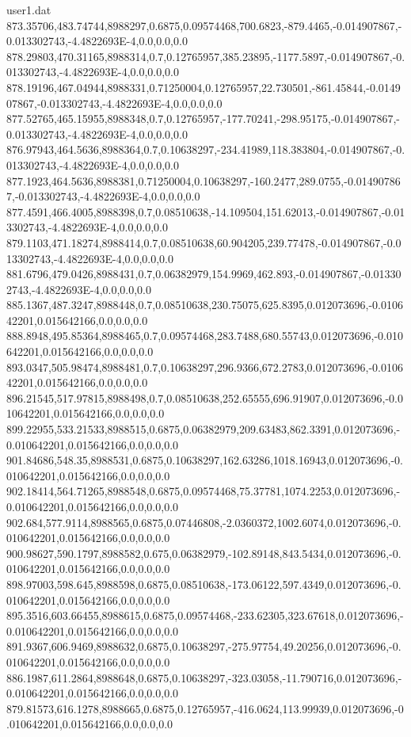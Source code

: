 \begin{filecontents}{user1.dat}
873.35706,483.74744,8988297,0.6875,0.09574468,700.6823,-879.4465,-0.014907867,-0.013302743,-4.4822693E-4,0.0,0.0,0.0
878.29803,470.31165,8988314,0.7,0.12765957,385.23895,-1177.5897,-0.014907867,-0.013302743,-4.4822693E-4,0.0,0.0,0.0
878.19196,467.04944,8988331,0.71250004,0.12765957,22.730501,-861.45844,-0.014907867,-0.013302743,-4.4822693E-4,0.0,0.0,0.0
877.52765,465.15955,8988348,0.7,0.12765957,-177.70241,-298.95175,-0.014907867,-0.013302743,-4.4822693E-4,0.0,0.0,0.0
876.97943,464.5636,8988364,0.7,0.10638297,-234.41989,118.383804,-0.014907867,-0.013302743,-4.4822693E-4,0.0,0.0,0.0
877.1923,464.5636,8988381,0.71250004,0.10638297,-160.2477,289.0755,-0.014907867,-0.013302743,-4.4822693E-4,0.0,0.0,0.0
877.4591,466.4005,8988398,0.7,0.08510638,-14.109504,151.62013,-0.014907867,-0.013302743,-4.4822693E-4,0.0,0.0,0.0
879.1103,471.18274,8988414,0.7,0.08510638,60.904205,239.77478,-0.014907867,-0.013302743,-4.4822693E-4,0.0,0.0,0.0
881.6796,479.0426,8988431,0.7,0.06382979,154.9969,462.893,-0.014907867,-0.013302743,-4.4822693E-4,0.0,0.0,0.0
885.1367,487.3247,8988448,0.7,0.08510638,230.75075,625.8395,0.012073696,-0.010642201,0.015642166,0.0,0.0,0.0
888.8948,495.85364,8988465,0.7,0.09574468,283.7488,680.55743,0.012073696,-0.010642201,0.015642166,0.0,0.0,0.0
893.0347,505.98474,8988481,0.7,0.10638297,296.9366,672.2783,0.012073696,-0.010642201,0.015642166,0.0,0.0,0.0
896.21545,517.97815,8988498,0.7,0.08510638,252.65555,696.91907,0.012073696,-0.010642201,0.015642166,0.0,0.0,0.0
899.22955,533.21533,8988515,0.6875,0.06382979,209.63483,862.3391,0.012073696,-0.010642201,0.015642166,0.0,0.0,0.0
901.84686,548.35,8988531,0.6875,0.10638297,162.63286,1018.16943,0.012073696,-0.010642201,0.015642166,0.0,0.0,0.0
902.18414,564.71265,8988548,0.6875,0.09574468,75.37781,1074.2253,0.012073696,-0.010642201,0.015642166,0.0,0.0,0.0
902.684,577.9114,8988565,0.6875,0.07446808,-2.0360372,1002.6074,0.012073696,-0.010642201,0.015642166,0.0,0.0,0.0
900.98627,590.1797,8988582,0.675,0.06382979,-102.89148,843.5434,0.012073696,-0.010642201,0.015642166,0.0,0.0,0.0
898.97003,598.645,8988598,0.6875,0.08510638,-173.06122,597.4349,0.012073696,-0.010642201,0.015642166,0.0,0.0,0.0
895.3516,603.66455,8988615,0.6875,0.09574468,-233.62305,323.67618,0.012073696,-0.010642201,0.015642166,0.0,0.0,0.0
891.9367,606.9469,8988632,0.6875,0.10638297,-275.97754,49.20256,0.012073696,-0.010642201,0.015642166,0.0,0.0,0.0
886.1987,611.2864,8988648,0.6875,0.10638297,-323.03058,-11.790716,0.012073696,-0.010642201,0.015642166,0.0,0.0,0.0
879.81573,616.1278,8988665,0.6875,0.12765957,-416.0624,113.99939,0.012073696,-0.010642201,0.015642166,0.0,0.0,0.0

\end{filecontents}
